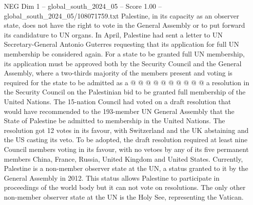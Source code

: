 \begin{textsample}{NEG Dim 1 – global\_south\_2024\_05 – Score 1.00 – global\_south\_2024\_05/108071759.txt}
Palestine, in its capacity as an observer state, does not have the right to vote in the General Assembly or to put forward its candidature to UN organs.
In April, Palestine had sent a letter to UN Secretary-General Antonio Guterres requesting that its application for full UN membership be considered again.
For a state to be granted full UN membership, its application must be approved both by the Security Council and the General Assembly, where a two-thirds majority of the members present and voting is required for the state to be admitted as a @ @ @ @ @ @ @ @ @ @ a resolution in the Security Council on the Palestinian bid to be granted full membership of the United Nations.
The 15-nation Council had voted on a draft resolution that would have recommended to the 193-member UN General Assembly that the State of Palestine be admitted to membership in the United Nations.
The resolution got 12 votes in its favour, with Switzerland and the UK abstaining and the US casting its veto.
To be adopted, the draft resolution required at least nine Council members voting in its favour, with no vetoes by any of its five permanent members China, France, Russia, United Kingdom and United States.
Currently, Palestine is a non-member observer state at the UN, a status granted to it by the General Assembly in 2012.
This status allows Palestine to participate in proceedings of the world body but it can not vote on resolutions.
The only other non-member observer state at the UN is the Holy See, representing the Vatican.

\end{textsample}
